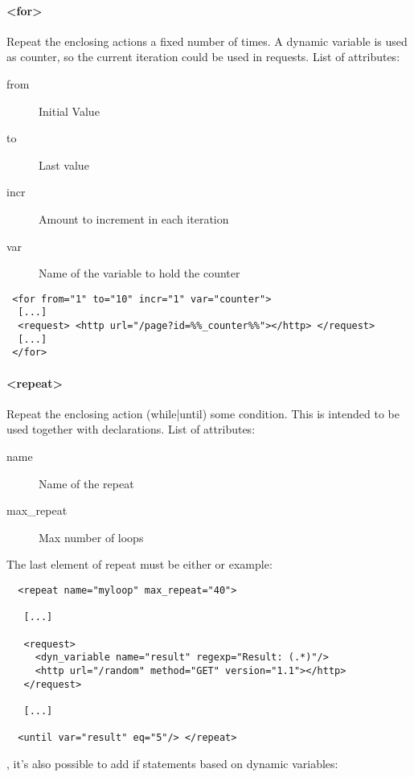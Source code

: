 \documentclass{TSUNG-en}
\begin{document}
\paragraph{<for>}


Repeat the enclosing actions a fixed number of times. A dynamic
variable is used as counter, so the current iteration could be used in
requests. List of attributes:

\begin{description}
\item[from] Initial Value
\item[to]   Last value
\item[incr] Amount to increment in each iteration
\item[var]  Name of the variable to hold the counter
\end{description}

\begin{Verbatim}
 <for from="1" to="10" incr="1" var="counter">
  [...]
  <request> <http url="/page?id=%%_counter%%"></http> </request>
  [...]
 </for>
\end{Verbatim}

\paragraph{<repeat>}
Repeat the enclosing action (while|until) some condition. This is
intended to be used together with  declarations. List of
attributes:

\begin{description}
\item[name] Name of the repeat
\item[max\_repeat] Max number of loops
\end{description}

The last element of repeat must be either  or  example:
\begin{Verbatim}
  <repeat name="myloop" max_repeat="40">

   [...]

   <request>
     <dyn_variable name="result" regexp="Result: (.*)"/>
     <http url="/random" method="GET" version="1.1"></http>
   </request>

   [...]

  <until var="result" eq="5"/> </repeat>
\end{Verbatim}

, it's also possible to add if statements based on
dynamic variables:
\end{document}

